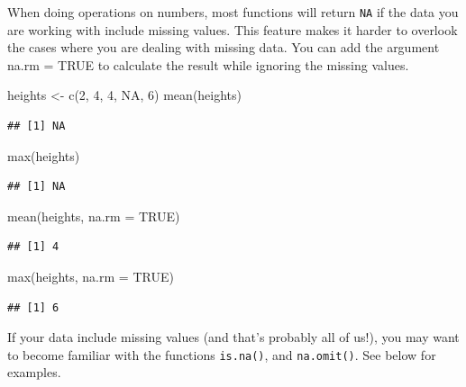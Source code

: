 \documentclass[
]{book}
\newenvironment{Shaded}{\begin{snugshade}}{\end{snugshade}}
\newcommand{\AttributeTok}[1]{\textcolor[rgb]{0.77,0.63,0.00}{#1}}
\newcommand{\ConstantTok}[1]{\textcolor[rgb]{0.00,0.00,0.00}{#1}}
\newcommand{\DecValTok}[1]{\textcolor[rgb]{0.00,0.00,0.81}{#1}}
\newcommand{\FunctionTok}[1]{\textcolor[rgb]{0.00,0.00,0.00}{#1}}
\newcommand{\NormalTok}[1]{#1}
\newcommand{\OtherTok}[1]{\textcolor[rgb]{0.56,0.35,0.01}{#1}}
\begin{document}
When doing operations on numbers, most functions will return \texttt{NA} if the data you are working with include missing values. This feature makes it harder to overlook the cases where you are dealing with missing data. You can add the argument na.rm = TRUE to calculate the result while ignoring the missing values.

\begin{Shaded}
\begin{Highlighting}[]
\NormalTok{heights }\OtherTok{\textless{}{-}} \FunctionTok{c}\NormalTok{(}\DecValTok{2}\NormalTok{, }\DecValTok{4}\NormalTok{, }\DecValTok{4}\NormalTok{, }\ConstantTok{NA}\NormalTok{, }\DecValTok{6}\NormalTok{)}
\FunctionTok{mean}\NormalTok{(heights)}
\end{Highlighting}
\end{Shaded}

\begin{verbatim}
## [1] NA
\end{verbatim}

\begin{Shaded}
\begin{Highlighting}[]
\FunctionTok{max}\NormalTok{(heights)}
\end{Highlighting}
\end{Shaded}

\begin{verbatim}
## [1] NA
\end{verbatim}

\begin{Shaded}
\begin{Highlighting}[]
\FunctionTok{mean}\NormalTok{(heights, }\AttributeTok{na.rm =} \ConstantTok{TRUE}\NormalTok{)}
\end{Highlighting}
\end{Shaded}

\begin{verbatim}
## [1] 4
\end{verbatim}

\begin{Shaded}
\begin{Highlighting}[]
\FunctionTok{max}\NormalTok{(heights, }\AttributeTok{na.rm =} \ConstantTok{TRUE}\NormalTok{)}
\end{Highlighting}
\end{Shaded}

\begin{verbatim}
## [1] 6
\end{verbatim}

If your data include missing values (and that's probably all of us!), you may want to become familiar with the functions \texttt{is.na()}, and \texttt{na.omit()}. See below for examples.
\end{document}
